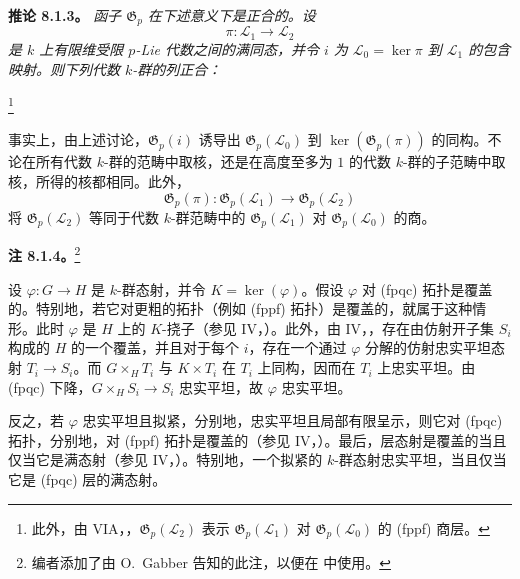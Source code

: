 \medskip
\noindent\textbf{推论 8.1.3。}
\label{sga3:VIIA:8.1.3}
\textit{函子 \(\mathfrak G_p\) 在下述意义下是正合的。设
\[
  \pi:\mathcal L_1\longrightarrow\mathcal L_2
\]
是 \(k\) 上有限维受限 \(p\)-Lie 代数之间的满同态，并令 \(i\) 为 \(\mathcal L_0=\ker\pi\) 到 \(\mathcal L_1\) 的包含映射。则下列代数 \(k\)-群的列正合：}
\begin{center}
  \label{sga3:VIIA:8.1.3-Gp-exact-sequence}
  
\end{center}
\footnote{此外，由 VIA，，\(\mathfrak G_p(\mathcal L_2)\) 表示 \(\mathfrak G_p(\mathcal L_1)\) 对 \(\mathfrak G_p(\mathcal L_0)\) 的 (fppf) 商层。}

事实上，由上述讨论，\(\mathfrak G_p(i)\) 诱导出 \(\mathfrak G_p(\mathcal L_0)\) 到 \(\ker(\mathfrak G_p(\pi))\) 的同构。不论在所有代数 \(k\)-群的范畴中取核，还是在高度至多为 \(1\) 的代数 \(k\)-群的子范畴中取核，所得的核都相同。此外，
\[
  \mathfrak G_p(\pi):
  \mathfrak G_p(\mathcal L_1)
  \longrightarrow
  \mathfrak G_p(\mathcal L_2)
\]
将 \(\mathfrak G_p(\mathcal L_2)\) 等同于代数 \(k\)-群范畴中的 \(\mathfrak G_p(\mathcal L_1)\) 对 \(\mathfrak G_p(\mathcal L_0)\) 的商。

\medskip
\noindent\textbf{注 8.1.4。}\footnote{编者添加了由 O.~Gabber 告知的此注，以便在  中使用。}
\label{sga3:VIIA:8.1.4}

设 \(\varphi:G\to H\) 是 \(k\)-群态射，并令 \(K=\ker(\varphi)\)。假设 \(\varphi\) 对 (fpqc) 拓扑是覆盖的。特别地，若它对更粗的拓扑（例如 (fppf) 拓扑）是覆盖的，就属于这种情形。此时 \(\varphi\) 是 \(H\) 上的 \(K\)-挠子（参见 IV，）。此外，由 IV，，存在由仿射开子集 \(S_i\) 构成的 \(H\) 的一个覆盖，并且对于每个 \(i\)，存在一个通过 \(\varphi\) 分解的仿射忠实平坦态射 \(T_i\to S_i\)。而 \(G\times_HT_i\) 与 \(K\times T_i\) 在 \(T_i\) 上同构，因而在 \(T_i\) 上忠实平坦。由 (fpqc) 下降，\(G\times_HS_i\to S_i\) 忠实平坦，故 \(\varphi\) 忠实平坦。

反之，若 \(\varphi\) 忠实平坦且拟紧，分别地，忠实平坦且局部有限呈示，则它对 (fpqc) 拓扑，分别地，对 (fppf) 拓扑是覆盖的（参见 IV，）。最后，层态射是覆盖的当且仅当它是满态射（参见 IV，）。特别地，一个拟紧的 \(k\)-群态射忠实平坦，当且仅当它是 (fpqc) 层的满态射。

